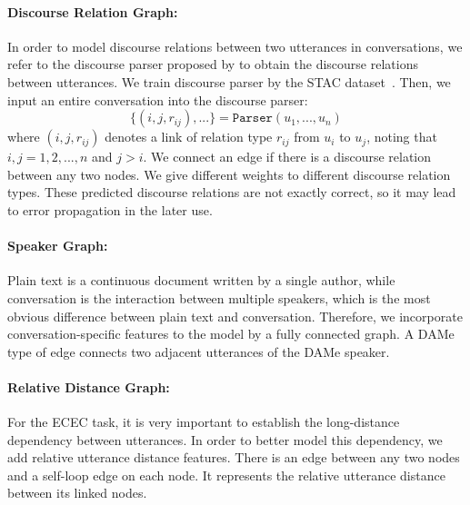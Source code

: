 \documentclass[11pt]{article}
\begin{document}
\paragraph{Discourse Relation Graph:}
In order to model discourse relations between two utterances in conversations, 
we refer to the discourse parser proposed by \citet{wang2021structure} to obtain the discourse relations between utterances. 
We train discourse parser by the STAC dataset~\cite{afantenosDiscourseParsingMultiparty2015}.
Then, we input an entire conversation into the discourse parser:
\begin{equation}
\{(i,j,r_{ij}),...\}= \texttt{Parser}(u_1,...,u_n)
\end{equation}
where $(i,j,r_{ij})$ denotes a link of relation type $r_{ij}$ from $u_i$ to $u_j$, noting that $i,j=1,2,...,n$ and $j>i$.
We connect an edge if there is a discourse relation between any two nodes.
We give different weights to different discourse relation types.
These predicted discourse relations are not exactly correct, so it may lead to error propagation in the later use.

\paragraph{Speaker Graph:} 
Plain text is a continuous document written by a single author, while conversation is the interaction between multiple speakers, which is the most obvious difference between plain text and conversation.
Therefore, we incorporate conversation-specific features to the model by a fully connected graph.
A DAMe type of edge connects two adjacent utterances of the DAMe speaker.

\paragraph{Relative Distance Graph:} 
For the ECEC task, it is very important to establish the long-distance dependency between utterances.
In order to better model this dependency, we add relative utterance distance features.
There is an edge between any two nodes and a self-loop edge on each node. 
It represents the relative utterance distance between its linked nodes.
\end{document}
